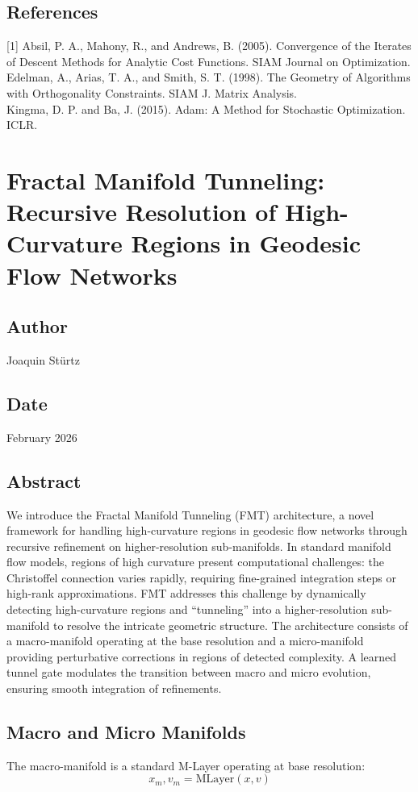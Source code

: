 \subsection*{References}
[1] Absil, P. A., Mahony, R., and Andrews, B. (2005). Convergence of the Iterates of Descent Methods for Analytic Cost Functions. SIAM Journal on Optimization.\\
[2] Edelman, A., Arias, T. A., and Smith, S. T. (1998). The Geometry of Algorithms with Orthogonality Constraints. SIAM J. Matrix Analysis.\\
[3] Kingma, D. P. and Ba, J. (2015). Adam: A Method for Stochastic Optimization. ICLR.

\section{Fractal Manifold Tunneling: Recursive Resolution of High-Curvature Regions in Geodesic Flow Networks}
\subsection*{Author}
Joaquin Stürtz
\subsection*{Date}
February 2026
\subsection*{Abstract}
We introduce the Fractal Manifold Tunneling (FMT) architecture, a novel framework for handling high-curvature regions in geodesic flow networks through recursive refinement on higher-resolution sub-manifolds. In standard manifold flow models, regions of high curvature present computational challenges: the Christoffel connection varies rapidly, requiring fine-grained integration steps or high-rank approximations. FMT addresses this challenge by dynamically detecting high-curvature regions and ``tunneling'' into a higher-resolution sub-manifold to resolve the intricate geometric structure. The architecture consists of a macro-manifold operating at the base resolution and a micro-manifold providing perturbative corrections in regions of detected complexity. A learned tunnel gate modulates the transition between macro and micro evolution, ensuring smooth integration of refinements.

\subsection{Macro and Micro Manifolds}
The macro-manifold is a standard M-Layer operating at base resolution:
$$x_m, v_m = \text{MLayer}(x, v)$$

